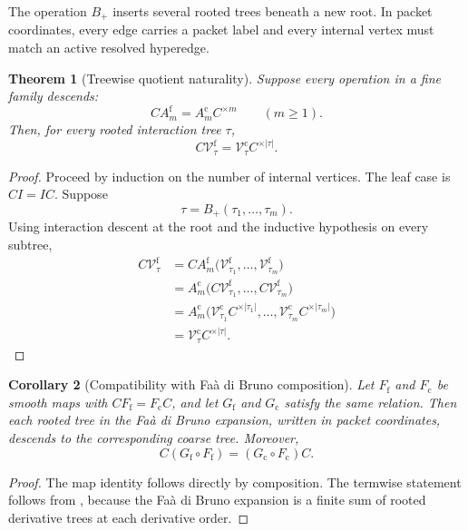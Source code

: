 \documentclass[11pt]{article}
\newtheorem{theorem}{Theorem}[section]
\newtheorem{corollary}[theorem]{Corollary}
\theoremstyle{definition}
\theoremstyle{remark}
\newcommand{\cV}{\mathcal V}
\newcommand{\fine}{\mathrm f}
\newcommand{\coarse}{\mathrm c}
\begin{document}
The operation $B_+$ inserts several rooted trees beneath a new root.  In packet coordinates, every edge carries a packet label and every internal vertex must match an active resolved hyperedge.

\begin{theorem}[Treewise quotient naturality]\label{thm:treewise-quotient}
Suppose every operation in a fine family descends:
\[
  CA_m^{\fine}=A_m^{\coarse}C^{\times m}
  \qquad(m\geq1).
\]
Then, for every rooted interaction tree $\tau$,
\begin{equation}\label{eq:treewise-quotient}
  \boxed{
  C\cV_{\tau}^{\fine}
  =
  \cV_{\tau}^{\coarse}C^{\times |\tau|}.}
\end{equation}
\end{theorem}

\begin{proof}
Proceed by induction on the number of internal vertices.  The leaf case is $CI=IC$.  Suppose
\[
  \tau=B_+(\tau_1,\ldots,\tau_m).
\]
Using interaction descent at the root and the inductive hypothesis on every subtree,
\begin{align*}
C\cV_{\tau}^{\fine}
&=
CA_m^{\fine}
\bigl(
\cV_{\tau_1}^{\fine},\ldots,
\cV_{\tau_m}^{\fine}
\bigr)\\
&=
A_m^{\coarse}
\bigl(
C\cV_{\tau_1}^{\fine},\ldots,
C\cV_{\tau_m}^{\fine}
\bigr)\\
&=
A_m^{\coarse}
\bigl(
\cV_{\tau_1}^{\coarse}C^{\times|\tau_1|},\ldots,
\cV_{\tau_m}^{\coarse}C^{\times|\tau_m|}
\bigr)\\
&=
\cV_{\tau}^{\coarse}C^{\times|\tau|}.
\end{align*}
\end{proof}

\begin{corollary}[Compatibility with Fa\`a di Bruno composition]\label{cor:faa-quotient}
Let $F_{\fine}$ and $F_{\coarse}$ be smooth maps with $CF_{\fine}=F_{\coarse}C$, and let $G_{\fine}$ and $G_{\coarse}$ satisfy the same relation.  Then each rooted tree in the Fa\`a di Bruno expansion, written in packet coordinates, descends to the corresponding coarse tree.  Moreover,
\[
  C(G_{\fine}\circ F_{\fine})
  =(G_{\coarse}\circ F_{\coarse})C.
\]
\end{corollary}

\begin{proof}
The map identity follows directly by composition.  The termwise statement follows from , because the Fa\`a di Bruno expansion is a finite sum of rooted derivative trees at each derivative order.
\end{proof}
\end{document}
